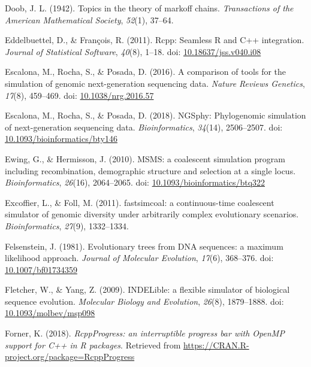 \documentclass[12pt,]{article}
\begin{document}
\leavevmode\hypertarget{ref-Doob_1942}{}%
Doob, J. L. (1942). Topics in the theory of markoff chains. \emph{Transactions of the American Mathematical Society}, \emph{52}(1), 37--64.

\leavevmode\hypertarget{ref-Eddelbuettel_2011}{}%
Eddelbuettel, D., \& François, R. (2011). Rcpp: Seamless R and C++ integration. \emph{Journal of Statistical Software}, \emph{40}(8), 1--18. doi: \href{https://doi.org/10.18637/jss.v040.i08}{10.18637/jss.v040.i08}

\leavevmode\hypertarget{ref-Escalona_2016}{}%
Escalona, M., Rocha, S., \& Posada, D. (2016). A comparison of tools for the simulation of genomic next-generation sequencing data. \emph{Nature Reviews Genetics}, \emph{17}(8), 459--469. doi: \href{https://doi.org/10.1038/nrg.2016.57}{10.1038/nrg.2016.57}

\leavevmode\hypertarget{ref-Escalona_2018}{}%
Escalona, M., Rocha, S., \& Posada, D. (2018). NGSphy: Phylogenomic simulation of next-generation sequencing data. \emph{Bioinformatics}, \emph{34}(14), 2506--2507. doi: \href{https://doi.org/10.1093/bioinformatics/bty146}{10.1093/bioinformatics/bty146}

\leavevmode\hypertarget{ref-Ewing_2010}{}%
Ewing, G., \& Hermisson, J. (2010). MSMS: a coalescent simulation program including recombination, demographic structure and selection at a single locus. \emph{Bioinformatics}, \emph{26}(16), 2064--2065. doi: \href{https://doi.org/10.1093/bioinformatics/btq322}{10.1093/bioinformatics/btq322}

\leavevmode\hypertarget{ref-Excoffier_2011}{}%
Excoffier, L., \& Foll, M. (2011). fastsimcoal: a continuous-time coalescent simulator of genomic diversity under arbitrarily complex evolutionary scenarios. \emph{Bioinformatics}, \emph{27}(9), 1332--1334.

\leavevmode\hypertarget{ref-Felsenstein_1981}{}%
Felsenstein, J. (1981). Evolutionary trees from DNA sequences: a maximum likelihood approach. \emph{Journal of Molecular Evolution}, \emph{17}(6), 368--376. doi: \href{https://doi.org/10.1007/bf01734359}{10.1007/bf01734359}

\leavevmode\hypertarget{ref-Fletcher_2009}{}%
Fletcher, W., \& Yang, Z. (2009). INDELible: a flexible simulator of biological sequence evolution. \emph{Molecular Biology and Evolution}, \emph{26}(8), 1879--1888. doi: \href{https://doi.org/10.1093/molbev/msp098}{10.1093/molbev/msp098}

\leavevmode\hypertarget{ref-Forner_2018}{}%
Forner, K. (2018). \emph{RcppProgress: an interruptible progress bar with OpenMP support for C++ in R packages}. Retrieved from \url{https://CRAN.R-project.org/package=RcppProgress}
\end{document}
